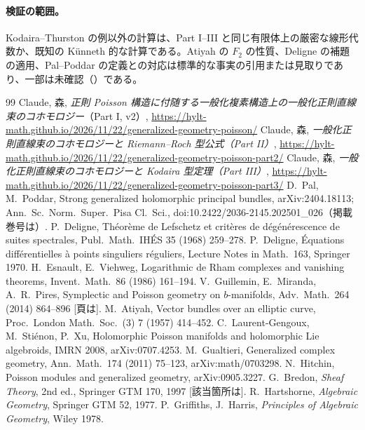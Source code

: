 \paragraph{検証の範囲。}Kodaira--Thurston の例以外の計算は、Part I--III と同じ有限体上の厳密な線形代数か、既知の Künneth 的な計算である。Atiyah の $F_2$ の性質、Deligne の補題の適用、Pal--Poddar の定義との対応は標準的な事実の引用または見取りであり、一部は未確認（\tQ）である。

\begin{thebibliography}{99}\small
{} Claude, 森, \emph{正則 Poisson 構造に付随する一般化複素構造上の一般化正則直線束のコホモロジー}（Part I, v2）, \url{https://hylt-math.github.io/2026/11/22/generalized-geometry-poisson/}
 Claude, 森, \emph{一般化正則直線束のコホモロジーと Riemann--Roch 型公式（Part II）}, \url{https://hylt-math.github.io/2026/11/22/generalized-geometry-poisson-part2/}
 Claude, 森, \emph{一般化正則直線束のコホモロジーと Kodaira 型定理（Part III）}, \url{https://hylt-math.github.io/2026/11/22/generalized-geometry-poisson-part3/}
 D.\ Pal, M.\ Poddar, Strong generalized holomorphic principal bundles, arXiv:2404.18113; Ann.\ Sc.\ Norm.\ Super.\ Pisa Cl.\ Sci., doi:10.2422/2036-2145.202501\_026（掲載巻号は\tQ）.
 P.\ Deligne, Th\'eor\`eme de Lefschetz et crit\`eres de d\'eg\'en\'erescence de suites spectrales, Publ.\ Math.\ IH\'ES 35 (1968) 259--278.
 P.\ Deligne, \'Equations diff\'erentielles \`a points singuliers r\'eguliers, Lecture Notes in Math.\ 163, Springer 1970.
 H.\ Esnault, E.\ Viehweg, Logarithmic de Rham complexes and vanishing theorems, Invent.\ Math.\ 86 (1986) 161--194.
 V.\ Guillemin, E.\ Miranda, A.\ R.\ Pires, Symplectic and Poisson geometry on $b$-manifolds, Adv.\ Math.\ 264 (2014) 864--896 [頁は\tQ].
 M.\ Atiyah, Vector bundles over an elliptic curve, Proc.\ London Math.\ Soc.\ (3) 7 (1957) 414--452.
 C.\ Laurent-Gengoux, M.\ Sti\'enon, P.\ Xu, Holomorphic Poisson manifolds and holomorphic Lie algebroids, IMRN 2008, arXiv:0707.4253.
 M.\ Gualtieri, Generalized complex geometry, Ann.\ Math.\ 174 (2011) 75--123, arXiv:math/0703298.
 N.\ Hitchin, Poisson modules and generalized geometry, arXiv:0905.3227.
 G.\ Bredon, \emph{Sheaf Theory}, 2nd ed., Springer GTM 170, 1997 [該当箇所は\tQ].
 R.\ Hartshorne, \emph{Algebraic Geometry}, Springer GTM 52, 1977.
 P.\ Griffiths, J.\ Harris, \emph{Principles of Algebraic Geometry}, Wiley 1978.
\end{thebibliography}
